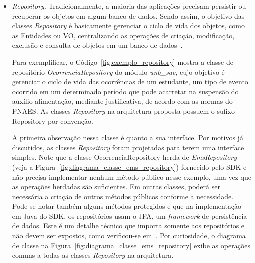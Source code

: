 		\begin{itemize}
		
			\item \textit{Repository}.	Tradicionalmente, a maioria das aplicações
			precisam persistir ou recuperar os objetos 
			em algum banco de dados.
			Sendo assim, o objetivo das 	
			classes \textit{Repository} é
			basicamente gerenciar o ciclo de vida dos objetos, 
			como as Entidades ou \acrshort{VO},
			centralizando as 
			operações de criação, modificação, exclusão
			e consulta de objetos em um banco de dados~\cite{vernon2013implementing}.
			
			Para exemplificar,
			o Código~\ref{fig:exemplo_repository} mostra
			a classe de repositório \emph{OcorrenciaRepository} 
			do módulo \emph{unb\_sae}, 
			cujo objetivo é gerenciar o ciclo de vida das
			ocorrências de um estudante, 
			um tipo
			de evento ocorrido em um determinado período	 
			que pode acarretar na suspensão do
			auxílio alimentação,
			mediante justificativa, de acordo 
			com as normas do \acrfull{PNAES}. 
			As classes \textit{Repository}
			na arquitetura proposta possuem
			o sufixo Repository por convenção. 
			
			A primeira observação 
			nessa classe é quanto 
			a sua interface. 
			Por motivos já discutidos,
			as classes \textit{Repository}
			foram projetadas para
			terem uma interface simples. 
			Note que
			a classe OcorrenciaRepository 
			herda de 
			\textit{EmsRepository} (veja a Figura~\ref{fig:diagrama_classe_ems_repository})
			fornecido pelo \acrshort{SDK}
			e não precisa implementar nenhum 
			método público nesse exemplo, 
			uma vez que as operações 
			herdadas são suficientes. Em outras classes,
			poderá ser necessária a criação
			de outros métodos públicos conforme 
			a necessidade. Pode-se notar também
			alguns métodos protegidos
			e que na implementação em Java do \acrshort{SDK}, 
			os repositórios usam o \acrfull{JPA},
			um \textit{framework} de persistência de dados.
			Este é um detalhe técnico que importa
			somente aos repositórios e não devem 
			ser expostos, como 
			verificou-se em~\cite{evans2004domain, fowler2002patterns}.			
			Por curiosidade, o diagrama de classe 
			na Figura~\ref{fig:diagrama_classe_ems_repository}
			exibe as operações comuns a todas
			as classes \textit{Repository}
			na arquitetura.
		

\end{itemize}
